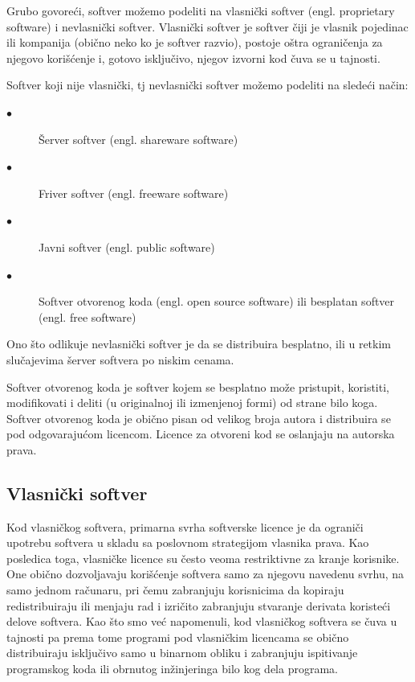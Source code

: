 \documentclass[a4paper]{article}
\begin{document}
Grubo govoreći, softver možemo podeliti na vlasnički softver (engl. proprietary software)
i nevlasnički softver. Vlasnički softver je softver čiji je vlasnik pojedinac ili kompanija
(obično neko ko je softver razvio), postoje oštra ograničenja za njegovo korišćenje i,
gotovo isključivo, njegov izvorni kod čuva se u tajnosti. \cite{p2}

Softver koji nije vlasnički, tj nevlasnički softver možemo podeliti na sledeći način:
    \begin{description}
        \item[$\bullet$] Šerver softver (engl. shareware software)
        \item[$\bullet$] Friver softver (engl. freeware software)
        \item[$\bullet$] Javni softver (engl. public software)
        \item[$\bullet$] Softver otvorenog koda (engl. open source software) ili besplatan softver (engl. free software) 
    \end{description}
Ono što odlikuje nevlasnički softver je da se distribuira besplatno, ili u retkim slučajevima šerver 
softvera po niskim cenama.

Softver otvorenog koda je softver kojem se besplatno može pristupit, koristiti, modifikovati i deliti
(u originalnoj ili izmenjenoj formi) od strane bilo koga. Softver otvorenog koda je obično pisan od velikog
broja autora i distribuira se pod odgovarajućom licencom. Licence za otvoreni kod se oslanjaju na autorska
prava. \cite{p2}

\subsection{Vlasnički softver}
\label{vlasnicki_softver}

Kod vlasničkog softvera, primarna svrha softverske licence je da ograniči upotrebu softvera u skladu sa 
poslovnom strategijom vlasnika prava. Kao posledica toga, vlasničke licence su često veoma restriktivne za 
kranje korisnike. One obično dozvoljavaju korišćenje softvera samo za njegovu navedenu svrhu, na samo jednom
računaru, pri čemu zabranjuju korisnicima da kopiraju redistribuiraju ili menjaju rad i izričito zabranjuju
stvaranje derivata koristeći delove softvera.
Kao što smo već napomenuli, kod vlasničkog softvera se čuva u tajnosti pa prema tome programi pod 
vlasničkim licencama se obično distribuiraju isključivo samo u binarnom obliku i zabranjuju ispitivanje
programskog koda ili obrnutog inžinjeringa bilo kog dela programa.
\end{document}
